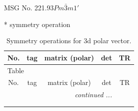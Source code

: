 \documentclass[fleqn,8pt]{jsarticle}
\begin{document}
\setcounter{MaxMatrixCols}{32}

\renewcommand{\tablename}{Table~}
\renewcommand{\figurename}{Figure~}
\begin{center}
\LARGE
MSG No. 221.93\quad$Pm\bar{3}m1'$
\end{center}
* symmetry operation
\renewcommand{\arraystretch}{1.3}
\begin{longtable}{ccccc}
\caption{Symmetry operations for 3d polar vector.}
 \\
 \hline \hline
No. & tag & matrix (polar) & det & TR \\ \hline \endfirsthead

\multicolumn{4}{l}{\tablename\ \thetable{}} \\
 \hline \hline
No. & tag & matrix (polar) & det & TR \\ \hline \endhead

 \hline \hline
\multicolumn{4}{r}{\footnotesize\it continued ...} \\ \endfoot

 \hline \hline
\multicolumn{4}{r}{} \\ \endlastfoot


\end{longtable}
\end{document}

